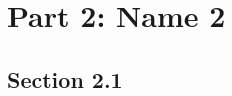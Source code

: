 \documentclass[module]{subfiles}
\begin{document}
\selectfont
\clearpage

\chapter{Part 2: Name 2}

\section{Section 2.1}
\lipsum[1]
\end{document}

